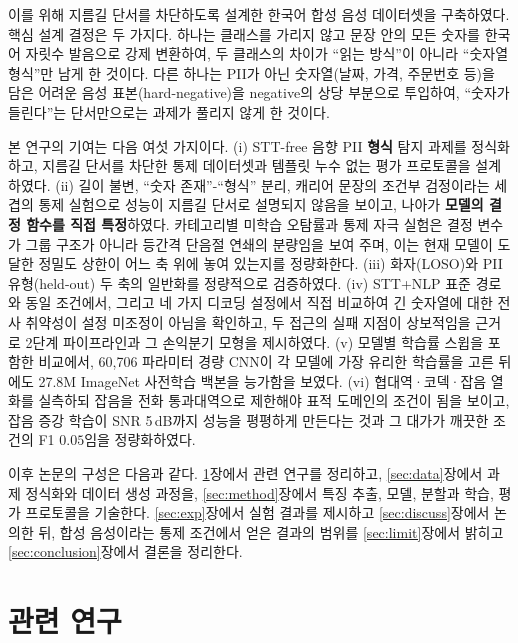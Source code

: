 \documentclass[11pt]{article}
\renewcommand{\emph}[1]{\textbf{#1}}
\begin{document}
이를 위해 지름길 단서를 차단하도록 설계한 한국어 합성 음성 데이터셋을 구축하였다. 핵심
설계 결정은 두 가지다. 하나는 클래스를 가리지 않고 문장 안의 모든 숫자를 한국어 자릿수
발음으로 강제 변환하여, 두 클래스의 차이가 ``읽는 방식''이 아니라 ``숫자열 형식''만 남게 한
것이다. 다른 하나는 PII가 아닌 숫자열(날짜, 가격, 주문번호 등)을 담은 어려운 음성
표본(hard-negative)을 negative의 상당 부분으로 투입하여, ``숫자가 들린다''는 단서만으로는
과제가 풀리지 않게 한 것이다.

본 연구의 기여는 다음 여섯 가지이다. (i) STT-free 음향 PII \emph{형식} 탐지 과제를
정식화하고, 지름길 단서를 차단한 통제 데이터셋과 템플릿 누수 없는 평가 프로토콜을
설계하였다. (ii) 길이 불변, ``숫자 존재''-``형식'' 분리, 캐리어 문장의 조건부 검정이라는 세
겹의 통제 실험으로 성능이 지름길 단서로 설명되지 않음을 보이고, 나아가 \emph{모델의 결정
함수를 직접 특정}하였다. 카테고리별 미학습 오탐률과 통제 자극 실험은 결정 변수가 그룹 구조가
아니라 등간격 단음절 연쇄의 분량임을 보여 주며, 이는 현재 모델이 도달한 정밀도 상한이
어느 축 위에 놓여 있는지를 정량화한다. (iii) 화자(LOSO)와 PII 유형(held-out) 두 축의 일반화를 정량적으로
검증하였다. (iv) STT+NLP 표준 경로와 동일 조건에서, 그리고 네 가지 디코딩 설정에서 직접
비교하여 긴 숫자열에 대한 전사 취약성이 설정 미조정이 아님을 확인하고, 두 접근의 실패 지점이
상보적임을 근거로 2단계 파이프라인과 그 손익분기 모형을 제시하였다. (v) 모델별 학습률
스윕을 포함한 비교에서, 60{,}706 파라미터 경량 CNN이 각 모델에 가장 유리한 학습률을 고른
뒤에도 27.8M ImageNet 사전학습 백본을 능가함을 보였다. (vi) 협대역·코덱·잡음 열화를
실측하되 잡음을 전화 통과대역으로 제한해야 표적 도메인의 조건이 됨을 보이고, 잡음 증강 학습이
SNR 5\,dB까지 성능을 평평하게 만든다는 것과 그 대가가 깨끗한 조건의 F1 $0.05$임을 정량화하였다.

이후 논문의 구성은 다음과 같다. \ref{sec:related}장에서 관련 연구를 정리하고,
\ref{sec:data}장에서 과제 정식화와 데이터 생성 과정을, \ref{sec:method}장에서 특징 추출,
모델, 분할과 학습, 평가 프로토콜을 기술한다. \ref{sec:exp}장에서 실험 결과를 제시하고
\ref{sec:discuss}장에서 논의한 뒤, 합성 음성이라는 통제 조건에서 얻은 결과의 범위를
\ref{sec:limit}장에서 밝히고 \ref{sec:conclusion}장에서 결론을 정리한다.

\section{관련 연구}\label{sec:related}
\end{document}
